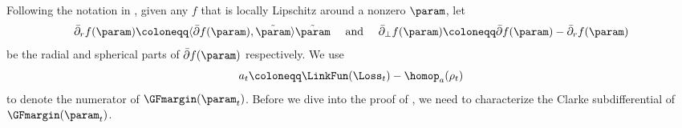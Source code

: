Following the notation in \citet{ji2020directional},
given any $f$ that is locally Lipschitz around a nonzero $\param$, let 
\[
    \bar  \partial_r f(\param) \coloneqq \langle \bar \partial f(\param), \tilde{\param} \rangle  \tilde{\param}  \quad \text{ and } \quad  \bar \partial_\perp f(\param) \coloneqq \bar \partial f(\param) - \bar  \partial_r f(\param)
\]
be the radial and spherical parts of $\bar \partial f(\param)$ respectively. We use 
\[a_t\coloneqq \LinkFun(\Loss_t) - \homop_a(\rho_t)\] to denote the numerator of $\GFmargin(\param_t)$. 
 Before we dive into the proof of , we need to characterize the Clarke subdifferential of $\GFmargin(\param_t)$. 


